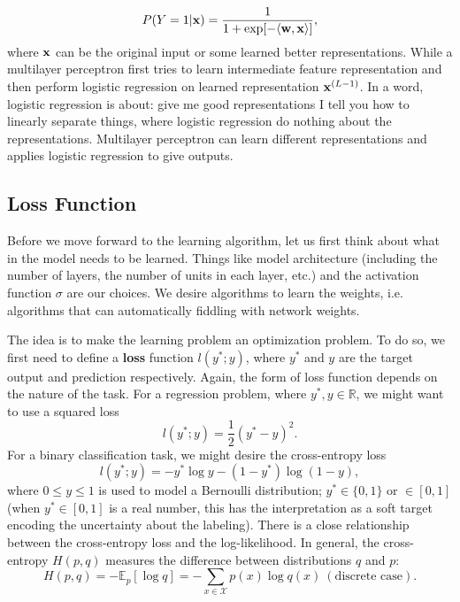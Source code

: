 \documentclass[../book-template.tex]{subfiles}
\begin{document}
\begin{equation*}
	P(Y=1|{\bf x})=\frac{1}{1+\exp[-\langle{\bf w,x}\rangle]},
\end{equation*}
where ${\bf x}$ can be the original input or some learned better representations. While a multilayer perceptron first tries to learn intermediate feature representation and then perform logistic regression on learned representation ${\bf x}^{(L-1)}$. In a word, logistic regression is about: give me good representations I tell you how to linearly separate things, where logistic regression do nothing about the representations. Multilayer perceptron can learn different representations and applies logistic regression to give outputs.
\subsection{Loss Function}
Before we move forward to the learning algorithm, let us first think about what in the model needs to be learned. Things like model architecture (including the number of layers, the number of units in each layer, etc.) and the activation function $\sigma$ are our choices. We desire algorithms to learn the weights, i.e. algorithms that can automatically fiddling with network weights. 
\par The idea is to make the learning problem an optimization problem. To do so, we first need to define a \textbf{loss} function $l(y^*;y)$, where $y^*$ and $y$ are the target output and prediction respectively. Again, the form of loss function depends on the nature of the task. For a regression problem, where $y^*,y\in \mathbb{R}$, we might want to use a squared loss
\begin{equation*}
l(y^*;y)=\frac{1}{2}(y^*-y)^2.
\end{equation*}
For a binary classification task, we might desire the cross-entropy loss
\begin{equation*}
	l(y^*;y)=-y^*\log y-(1-y^*)\log(1-y),
\end{equation*}
where $0\leq y\leq 1$ is used to model a Bernoulli distribution; $y^*\in \{0,1\}$ or $\in [0,1]$ (when $y^*\in [0,1]$ is a real number, this has the interpretation as a soft target encoding the uncertainty about the labeling). There is a close relationship between the cross-entropy loss and the log-likelihood. In general, the cross-entropy $H(p,q)$ measures the difference between distributions $q$ and $p$:
\begin{equation*}
	H(p,q)=-\mathbb{E}_p[\log q]=-\sum_{x\in\mathcal{X}}p(x)\log q(x)\ (\text{discrete case}).
\end{equation*}
\end{document}
